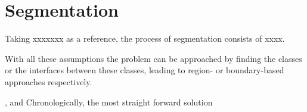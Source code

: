 \graphicspath{ {./content/analysis/figures/} }

\section{Segmentation}
\label{sec:seg-analysis}


Taking xxxxxxx as a reference, the process of segmentation consists of xxxx.

With all these assumptions the problem can be approached by finding the classes or the interfaces between these classes, leading to region- or boundary-based approaches respectively.

, and Chronologically, the most straight forward solution 
